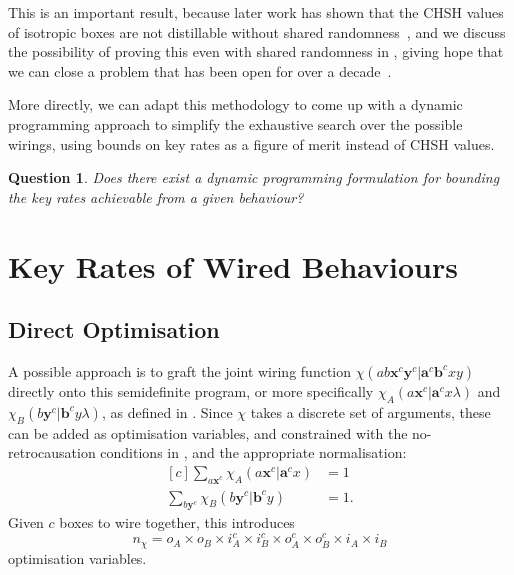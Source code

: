 \documentclass[10pt, a4paper]{article}
\numberwithin{equation}{section} %
\theoremstyle{definition}
\theoremstyle{plain}
\newtheorem{question}{Question}
\newcommand{\?}{\mathrel{?}} %
\newcommand{\cvec}[1]{\boldsymbol{\mathbf{#1}}}    %
\begin{document}
      This is an important result, because later work has shown that the CHSH values of isotropic boxes are not distillable without shared randomness~\cite{NLMonotones}, and we discuss the possibility of proving this even with shared randomness in , giving hope that we can close a problem that has been open for over a decade~\cite{NLLimits, DistillationBounds}.

      More directly, we can adapt this methodology to come up with a dynamic programming approach to simplify the exhaustive search over the possible wirings, using bounds on key rates as a figure of merit instead of CHSH values.

      \begin{question}
        Does there exist a dynamic programming formulation for bounding the key rates achievable from a given behaviour?
      \end{question}

      \section{Key Rates of Wired Behaviours}

      \subsection{Direct Optimisation}

      A possible approach is to graft the joint wiring function \(\chi(ab\cvec{x}^c\cvec{y}^c|\cvec{a}^c\cvec{b}^cxy)\) directly onto this semidefinite program, or more specifically \(\chi_A(a\cvec{x}^c|\cvec{a}^cx \lambda)\) and \(\chi_B(b\cvec{y}^c|\cvec{b}^cy \lambda)\), as defined in . Since \(\chi\) takes a discrete set of arguments, these can be added as optimisation variables, and constrained with the no-retrocausation conditions in , and the appropriate normalisation:
      \begin{equation}
        \begin{aligned}[c]
          \sum_{a\cvec{x}^c} \chi_A(a\cvec{x}^c|\cvec{a}^cx) &= 1 \\
          \sum_{b\cvec{y}^c} \chi_B(b\cvec{y}^c|\cvec{b}^cy) &= 1.
        \end{aligned}
      \end{equation}
      Given \(c\) boxes to wire together, this introduces
      \begin{equation}
        n_{\chi} = o_A \times o_B \times i_A^c \times i_B^c \times o_A^c \times o_B^c \times i_A \times i_B
      \end{equation}
      optimisation variables.
\end{document}
